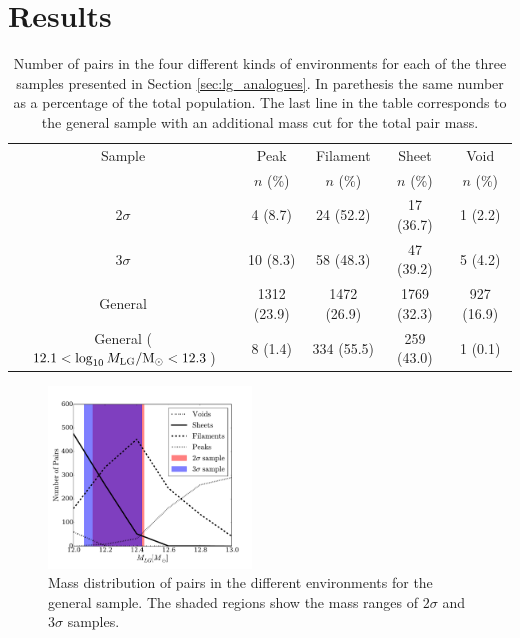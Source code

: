 \documentclass{emulateapj}
\newcommand{\Msun}{{\ifmmode{{\rm {M_{\odot}}}}\else{${\rm{M_{\odot}}}$}\fi}}
\begin{document}
\section{Results}
\label{sec:results}

\begin{table}
\begin{center}
\begin{tabular}{ccccc}\hline\hline
Sample & Peak & Filament & Sheet & Void\\
       & $n$ (\%) & $n$ (\%) & $n$ (\%) & $n$ (\%) \\\hline
2$\sigma$ & 4 (8.7) & 24 (52.2) &  17 (36.7) & 1 (2.2)\\
3$\sigma$ & 10 (8.3) & 58 (48.3) & 47 (39.2) & 5 (4.2)\\  
General & 1312 (23.9) & 1472 (26.9) & 1769 (32.3) & 927 (16.9)\\
General ($12.1<\log_{10} M_{\rm LG}/\Msun<12.3$)& 8 (1.4) & 334 (55.5) & 259
(43.0) & 1 (0.1)\\
\hline\hline
\end{tabular}
\caption{
Number of pairs in the four different kinds of environments for each
of the three samples presented in Section \ref{sec:lg_analogues}. 
In parethesis the same number as a percentage of the total population.
The last line in the table corresponds to the general sample with an
additional mass cut for the total pair mass.  
\label{table:web_type}}
\end{center}
\end{table}



\begin{figure}
\begin{center}
  \includegraphics[width=0.48\textwidth]{histogram_mass_distro.pdf}
\caption{Mass distribution of pairs in the different environments
for the general sample.
The shaded regions show the mass ranges of $2\sigma$ and $3\sigma$
samples.  
\label{fig:median_fraction}}
\end{center}
\end{figure}
\end{document}
